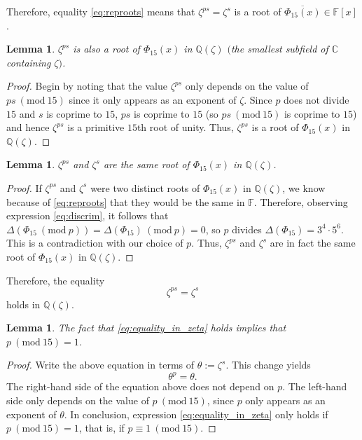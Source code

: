\documentclass[a4paper, 12pt]{article}
\newtheorem{lemma}[theorem]{Lemma}
\theoremstyle{definition}
\newcommand{\Q}{\ensuremath{\mathbb{Q}}}
\newcommand{\C}{\ensuremath{\mathbb{C}}}
\newcommand{\F}{\ensuremath{\mathbb{F}}}
\newcommand{\Mod}[1]{\ (\mathrm{mod}\ #1)} %
\begin{document}
Therefore, equality \eqref{eq:reproots} means that $\zeta^{ps}=\zeta^{s}$ is a root of $\overline{\Phi_{15}(x)}\in\F[x]$. 

\begin{lemma}
$\zeta^{ps}$ is also a root of $\Phi_{15}(x)$ in $\Q(\zeta)$ $($the smallest subfield of $\C$ containing $\zeta)$.
\end{lemma}
\begin{proof}
Begin by noting that the value $\zeta^{ps}$ only depends on the value of $ps \Mod{15}$ since it only appears as an exponent of $\zeta$. Since $p$ does not divide $15$ and $s$ is coprime to $15$, $ps$ is coprime to $15$ (so $ps \Mod{15}$ is coprime to $15$) and hence $\zeta^{ps}$ is a primitive $15$th root of unity. Thus, $\zeta^{ps}$ is a root of $\Phi_{15}(x)$ in $\Q(\zeta)$.
\end{proof}

\begin{lemma}
$\zeta^{ps}$ and $\zeta^{s}$ are the same root of $\Phi_{15}(x)$ in $\Q(\zeta)$.
\end{lemma}
\begin{proof}
If $\zeta^{ps}$ and $\zeta^{s}$ were two distinct roots of $\Phi_{15}(x)$ in $\Q(\zeta)$, we know because of \eqref{eq:reproots} that they would be the same in $\F$. Therefore, observing expression \eqref{eq:discrim}, it follows that $\Delta(\Phi_{15} \Mod{p})=\Delta(\Phi_{15}) \Mod{p}=0$, so $p$ divides $\Delta(\Phi_{15})=3^{4} \cdot 5^{6}$. This is a contradiction with our choice of $p$. Thus, $\zeta^{ps}$ and $\zeta^{s}$ are in fact the same root of $\Phi_{15}(x)$ in $\Q(\zeta)$.
\end{proof}

Therefore, the equality
\begin{equation}\label{eq:equality_in_zeta}
\zeta^{ps}=\zeta^{s}
\end{equation}
holds in $\Q(\zeta)$. 
\begin{lemma}
The fact that \eqref{eq:equality_in_zeta} holds implies that $p \Mod{15}=1$.
\end{lemma}
\begin{proof}
Write the above equation in terms of $\theta:=\zeta^{s}$. This change yields
\begin{equation*}
\theta^{p}=\theta.
\end{equation*}
The right-hand side of the equation above does not depend on $p$. The left-hand side only depends on the value of $p\Mod{15}$, since $p$ only appears as an exponent of $\theta$. In conclusion, expression \eqref{eq:equality_in_zeta} only holds if $p \Mod{15}=1$, that is, if $p\equiv 1\Mod{15}$.
\end{proof}
\end{document}
